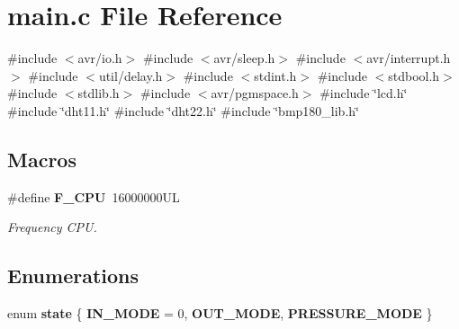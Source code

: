 \section{main.\+c File Reference}
\label{main_8c}
{\ttfamily \#include $<$avr/io.\+h$>$}\newline
{\ttfamily \#include $<$avr/sleep.\+h$>$}\newline
{\ttfamily \#include $<$avr/interrupt.\+h$>$}\newline
{\ttfamily \#include $<$util/delay.\+h$>$}\newline
{\ttfamily \#include $<$stdint.\+h$>$}\newline
{\ttfamily \#include $<$stdbool.\+h$>$}\newline
{\ttfamily \#include $<$stdlib.\+h$>$}\newline
{\ttfamily \#include $<$avr/pgmspace.\+h$>$}\newline
{\ttfamily \#include \char`\"{}lcd.\+h\char`\"{}}\newline
{\ttfamily \#include \char`\"{}dht11.\+h\char`\"{}}\newline
{\ttfamily \#include \char`\"{}dht22.\+h\char`\"{}}\newline
{\ttfamily \#include \char`\"{}bmp180\+\_\+lib.\+h\char`\"{}}\newline
\subsection*{Macros}
\begin{DoxyCompactItemize}
\item 
\#define \textbf{ F\+\_\+\+C\+PU}~16000000\+UL
\begin{DoxyCompactList}\small\item\em Frequency C\+PU. \end{DoxyCompactList}\end{DoxyCompactItemize}
\subsection*{Enumerations}
\begin{DoxyCompactItemize}
\item 
enum \textbf{ state} \{ \textbf{ I\+N\+\_\+\+M\+O\+DE} = 0, 
\textbf{ O\+U\+T\+\_\+\+M\+O\+DE}, 
\textbf{ P\+R\+E\+S\+S\+U\+R\+E\+\_\+\+M\+O\+DE}
 \}
\end{DoxyCompactItemize}
